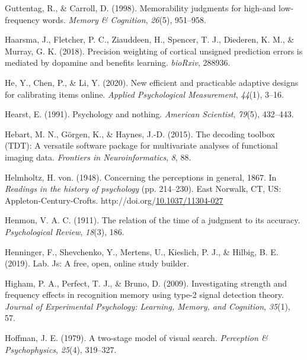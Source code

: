 \documentclass[12pt,twoside]{reedthesis}
\newenvironment{CSLReferences}%
  {}%
  {\par}
\begin{document}
\begin{CSLReferences}{1}{0}
\leavevmode\hypertarget{ref-guttentag1998memorability}{}%
Guttentag, R., \& Carroll, D. (1998). Memorability judgments for high-and low-frequency words. \emph{Memory \& Cognition}, \emph{26}(5), 951--958.

\leavevmode\hypertarget{ref-haarsma2018precision}{}%
Haarsma, J., Fletcher, P. C., Ziauddeen, H., Spencer, T. J., Diederen, K. M., \& Murray, G. K. (2018). Precision weighting of cortical unsigned prediction errors is mediated by dopamine and benefits learning. \emph{bioRxiv}, 288936.

\leavevmode\hypertarget{ref-he2020new}{}%
He, Y., Chen, P., \& Li, Y. (2020). New efficient and practicable adaptive designs for calibrating items online. \emph{Applied Psychological Measurement}, \emph{44}(1), 3--16.

\leavevmode\hypertarget{ref-hearst1991psychology}{}%
Hearst, E. (1991). Psychology and nothing. \emph{American Scientist}, \emph{79}(5), 432--443.

\leavevmode\hypertarget{ref-hebart2015decoding}{}%
Hebart, M. N., Görgen, K., \& Haynes, J.-D. (2015). The decoding toolbox (TDT): A versatile software package for multivariate analyses of functional imaging data. \emph{Frontiers in Neuroinformatics}, \emph{8}, 88.

\leavevmode\hypertarget{ref-helmholtz_concerning_1948}{}%
Helmholtz, H. von. (1948). Concerning the perceptions in general, 1867. In \emph{Readings in the history of psychology} (pp. 214--230). East Norwalk, CT, US: Appleton-Century-Crofts. http://doi.org/\href{https://doi.org/10.1037/11304-027}{10.1037/11304-027}

\leavevmode\hypertarget{ref-henmon1911relation}{}%
Henmon, V. A. C. (1911). The relation of the time of a judgment to its accuracy. \emph{Psychological Review}, \emph{18}(3), 186.

\leavevmode\hypertarget{ref-henninger2019lab}{}%
Henninger, F., Shevchenko, Y., Mertens, U., Kieslich, P. J., \& Hilbig, B. E. (2019). Lab. Js: A free, open, online study builder.

\leavevmode\hypertarget{ref-higham2009investigating}{}%
Higham, P. A., Perfect, T. J., \& Bruno, D. (2009). Investigating strength and frequency effects in recognition memory using type-2 signal detection theory. \emph{Journal of Experimental Psychology: Learning, Memory, and Cognition}, \emph{35}(1), 57.

\leavevmode\hypertarget{ref-hoffman1979two}{}%
Hoffman, J. E. (1979). A two-stage model of visual search. \emph{Perception \& Psychophysics}, \emph{25}(4), 319--327.


\end{CSLReferences}
\end{document}
